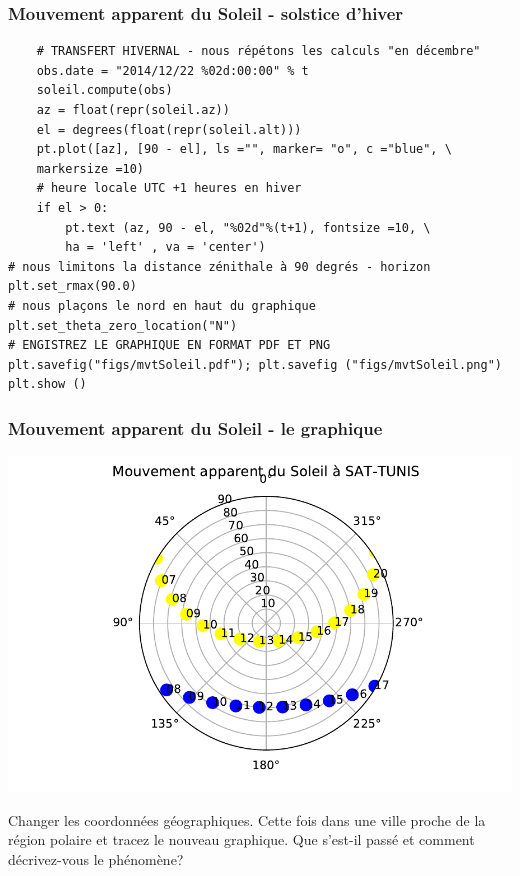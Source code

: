 \documentclass{beamer}
\newenvironment{doconceexercise}{}{}
\newcounter{doconceexercisecounter}
\newcounter{doconce:movie:counter}
\begin{document}
\begin{frame}
\frametitle{Mouvement apparent du Soleil - solstice d'hiver}

\begin{verbatim}
    # TRANSFERT HIVERNAL - nous répétons les calculs "en décembre"
    obs.date = "2014/12/22 %02d:00:00" % t
    soleil.compute(obs)
    az = float(repr(soleil.az))
    el = degrees(float(repr(soleil.alt)))
    pt.plot([az], [90 - el], ls ="", marker= "o", c ="blue", \
    markersize =10)
    # heure locale UTC +1 heures en hiver
    if el > 0:
        pt.text (az, 90 - el, "%02d"%(t+1), fontsize =10, \
        ha = 'left' , va = 'center')
# nous limitons la distance zénithale à 90 degrés - horizon
plt.set_rmax(90.0)
# nous plaçons le nord en haut du graphique
plt.set_theta_zero_location("N")
# ENGISTREZ LE GRAPHIQUE EN FORMAT PDF ET PNG
plt.savefig("figs/mvtSoleil.pdf"); plt.savefig ("figs/mvtSoleil.png")
plt.show ()
\end{verbatim}
\end{frame}

\begin{frame}
\frametitle{Mouvement apparent du Soleil - le graphique}

\vspace{6mm}

\centerline{\includegraphics[width=0.9\linewidth]{figs/mvtSoleil.pdf}}

\vspace{6mm}
\end{frame}

\begin{frame}

\begin{doconceexercise}



Changer les coordonnées géographiques. Cette fois dans une ville proche de la région polaire et tracez le nouveau graphique. Que s'est-il passé et comment décrivez-vous le phénomène?

\end{doconceexercise}
\end{frame}
\end{document}
